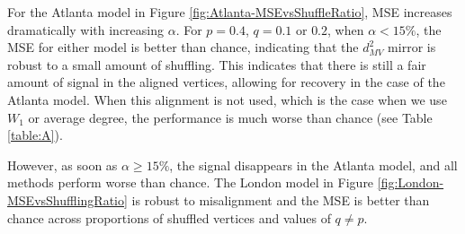 \documentclass[12pt]{article}
\theoremstyle{definition}
\begin{document}
For the Atlanta model in Figure \ref{fig:Atlanta-MSEvsShuffleRatio}, MSE increases dramatically with increasing $\alpha$. For $p=0.4$, $q = 0.1$ or $0.2$, when $\alpha < 15
\%$, the MSE for either model is better than chance, indicating that the $d^2_{MV}$ mirror is robust to a small amount of shuffling. This indicates that there is still a fair amount of signal in the aligned vertices, allowing for recovery in the case of the Atlanta model. When this alignment is not used, which is the case when we use $W_1$ or average degree, the performance is much worse than chance (see Table \ref{table:A}).

However, as soon as $\alpha\geq 15\%$, the signal disappears in the Atlanta model, and all methods perform worse than chance. The London model in Figure \ref{fig:London-MSEvsShufflingRatio} is robust to misalignment and the MSE is better than chance across proportions of shuffled vertices and values of $q\neq p$.

\end{document}
